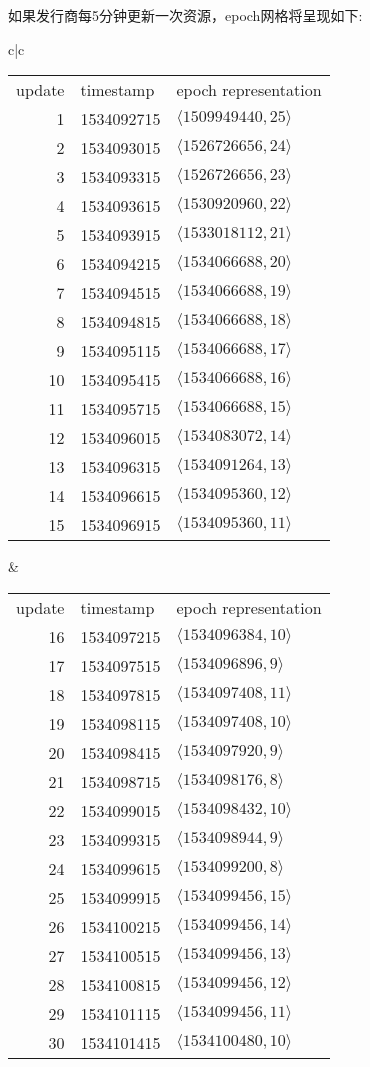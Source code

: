 如果发行商每5分钟更新一次资源，epoch网格将呈现如下:

{\small
\begin{tabular}{c|c}
\begin{tabular}{r|l|l}
update & timestamp & epoch representation\\
1 & 1534092715 & $\langle  1509949440, 25\rangle$\\
2 & 1534093015 & $\langle  1526726656, 24\rangle$\\
3 & 1534093315 & $\langle  1526726656, 23\rangle$\\
4 & 1534093615 & $\langle  1530920960, 22\rangle$\\
5 & 1534093915 & $\langle  1533018112, 21\rangle$\\
6 & 1534094215 & $\langle  1534066688, 20\rangle$\\
7 & 1534094515 & $\langle  1534066688, 19\rangle$\\
8 & 1534094815 & $\langle  1534066688, 18\rangle$\\
9 & 1534095115 & $\langle  1534066688, 17\rangle$\\
10 & 1534095415 & $\langle 1534066688, 16\rangle$\\
11 & 1534095715 & $\langle 1534066688, 15\rangle$\\
12 & 1534096015 & $\langle 1534083072, 14\rangle$\\
13 & 1534096315 & $\langle 1534091264, 13\rangle$\\
14 & 1534096615 & $\langle 1534095360, 12\rangle$\\
15 & 1534096915 & $\langle 1534095360, 11\rangle$
\end{tabular}
&
\begin{tabular}{r|l|l}
update & timestamp & epoch representation\\
16 & 1534097215 & $\langle 1534096384, 10\rangle$\\
17 & 1534097515 & $\langle 1534096896, 9\rangle$\\
18 & 1534097815 & $\langle 1534097408, 11\rangle$\\
19 & 1534098115 & $\langle 1534097408, 10\rangle$\\
20 & 1534098415 & $\langle 1534097920, 9\rangle$\\
21 & 1534098715 & $\langle 1534098176, 8\rangle$\\
22 & 1534099015 & $\langle 1534098432, 10\rangle$\\
23 & 1534099315 & $\langle 1534098944, 9\rangle$\\
24 & 1534099615 & $\langle 1534099200, 8\rangle$\\
25 & 1534099915 & $\langle 1534099456, 15\rangle$\\
26 & 1534100215 & $\langle 1534099456, 14\rangle$\\
27 & 1534100515 & $\langle 1534099456, 13\rangle$\\
28 & 1534100815 & $\langle 1534099456, 12\rangle$\\
29 & 1534101115 & $\langle 1534099456, 11\rangle$\\
30 & 1534101415 & $\langle 1534100480, 10\rangle$
\end{tabular}
\end{tabular}
}


